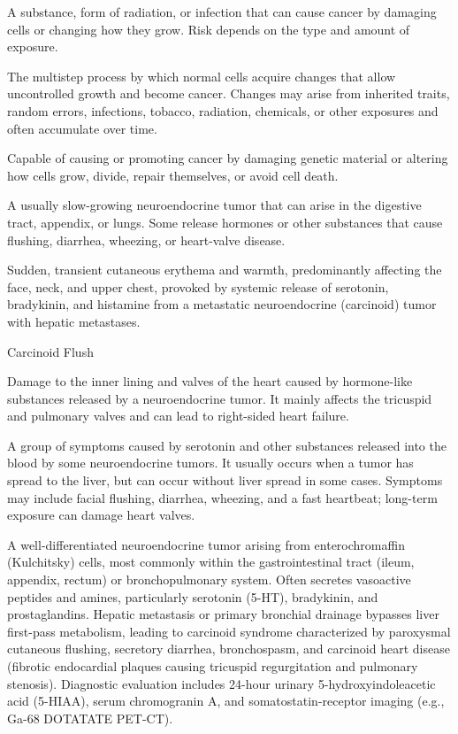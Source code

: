  A substance, form of radiation, or infection that can cause cancer by damaging cells or changing how they grow. Risk depends on the type and amount of exposure.

 The multistep process by which normal cells acquire changes that allow uncontrolled growth and become cancer. Changes may arise from inherited traits, random errors, infections, tobacco, radiation, chemicals, or other exposures and often accumulate over time.

 Capable of causing or promoting cancer by damaging genetic material or altering how cells grow, divide, repair themselves, or avoid cell death.

 A usually slow-growing neuroendocrine tumor that can arise in the digestive tract, appendix, or lungs. Some release hormones or other substances that cause flushing, diarrhea, wheezing, or heart-valve disease.

 Sudden, transient cutaneous erythema and warmth, predominantly affecting the face, neck, and upper chest, provoked by systemic release of serotonin, bradykinin, and histamine from a metastatic neuroendocrine (carcinoid) tumor with hepatic metastases.

\synonyms
Carcinoid Flush

 Damage to the inner lining and valves of the heart caused by hormone-like substances released by a neuroendocrine tumor. It mainly affects the tricuspid and pulmonary valves and can lead to right-sided heart failure.

 A group of symptoms caused by serotonin and other substances released into the blood by some neuroendocrine tumors. It usually occurs when a tumor has spread to the liver, but can occur without liver spread in some cases. Symptoms may include facial flushing, diarrhea, wheezing, and a fast heartbeat; long-term exposure can damage heart valves.

 A well-differentiated neuroendocrine tumor arising from enterochromaffin (Kulchitsky) cells, most commonly within the gastrointestinal tract (ileum, appendix, rectum) or bronchopulmonary system. Often secretes vasoactive peptides and amines, particularly serotonin (5-HT), bradykinin, and prostaglandins. Hepatic metastasis or primary bronchial drainage bypasses liver first-pass metabolism, leading to carcinoid syndrome characterized by paroxysmal cutaneous flushing, secretory diarrhea, bronchospasm, and carcinoid heart disease (fibrotic endocardial plaques causing tricuspid regurgitation and pulmonary stenosis). Diagnostic evaluation includes 24-hour urinary 5-hydroxyindoleacetic acid (5-HIAA), serum chromogranin A, and somatostatin-receptor imaging (e.g., Ga-68 DOTATATE PET-CT).

